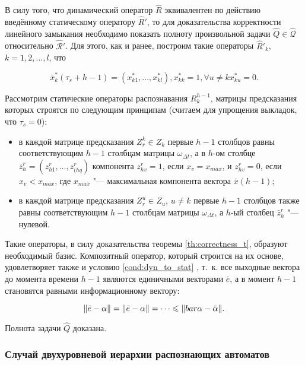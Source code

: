 \begin{Proof}
	В силу того, что динамический оператор $\hat{R}$ эквивалентен по действию введённому статическому оператору $\hat R'$, то для доказательства корректности линейного замыкания необходимо показать полноту произвольной задачи $\hat Q\in\hat{\mathcal Q}$ относительно $\hat{\mathcal R}'$. Для этого, как и ранее, построим такие операторы $\hat R'_k$, $k=1,2,\dots,l$, что 
	
	\[
	\bar x_k^*(\tau_s+h-1)=(x_{k1}^*,\dots,x_{kl}^*), x_{kk}^*=1, \forall u\not=k x_{ku}^*=0.
	\]	
		
	Рассмотрим статические операторы распознавания $R_k^{h-1}$, матрицы предсказания которых строятся по следующим принципам (считаем для упрощения выкладок, что $\tau_s=0$):
	
	\begin{itemize}
		\item в каждой матрице предсказания $Z_r^k\in Z_k$ первые $h-1$ столбцов равны соответствующим $h-1$ столбцам матрицы $\omega_{\Delta t}$, а в $h$-ом столбце $\bar z_{h}^r=(z_{h1}^r,\dots,z_{(hq}^r)$ компонента $z_{hv}^r=1$, если $x_v=x_{max}$, и $z_{hv}^r=0$, если $x_v<x_{max}$, где $x_{max}$ "--- максимальная компонента вектора $\bar x(h-1)$;
		\item в каждой матрице предсказания $Z_r^u\in Z_u$, $u\not = k$ первые $h-1$ столбцов также равны соответствующим $h-1$ столбцам матрицы $\omega_{\Delta t}$, а $h$-ый столбец $\bar z_h^r$ "--- нулевой.
	\end{itemize}
	
	Такие операторы, в силу доказательства теоремы \ref{th:correctness_t}, образуют необходимый базис. Композитный оператор, который строится на их основе, удовлетворяет также и условию \ref{cond:dyn_to_stat} , т.~к. все выходные вектора до момента времени $h-1$ являются единичными векторами $\bar e$, а в момент $h-1$ становятся равными информационному вектору:
	
	\[
		\|\bar e - \alpha\| = \|\bar e - \alpha\| = \dots \leqslant \|\\bar\alpha - \bar\alpha\|.
	\]
	
	Полнота задачи $\hat Q$ доказана.
\end{Proof}
	
\subsubsection{Случай двухуровневой иерархии распознающих автоматов}

